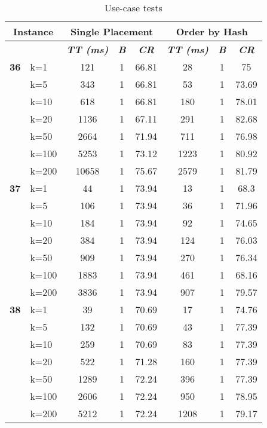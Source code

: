     \begin{table}[htbp]
    \caption{Use-case tests}
    \begin{tabular}{|l|l|c|c|c|c|c|c|}
    
    \multicolumn{ 2}{|c|}{\textbf{Instance}} & \multicolumn{ 3}{c|}{\textbf{Single Placement}} & \multicolumn{ 3}{c|}{\textbf{Order by Hash}} \\ \hline
    \multicolumn{ 2}{|l|}{} & \textbf{\textit{TT (ms)}} & \textbf{\textit{B}} & \textbf{\textit{CR}} & \textbf{\textit{TT (ms)}} & \textbf{\textit{B}} & \textbf{\textit{CR}} \\ \hline
    \multicolumn{1}{|r|}{\textbf{36}} & k=1 & 121 & 1 & 66.81 & 28 & 1 & 75 \\ 
     & k=5 & 343 & 1 & 66.81 & 53 & 1 & 73.69 \\ 
     & k=10 & 618 & 1 & 66.81 & 180 & 1 & 78.01 \\ 
     & k=20 & 1136 & 1 & 67.11 & 291 & 1 & 82.68 \\ 
     & k=50 & 2664 & 1 & 71.94 & 711 & 1 & 76.98 \\ 
     & k=100 & 5253 & 1 & 73.12 & 1223 & 1 & 80.92 \\ 
     & k=200 & 10658 & 1 & 75.67 & 2579 & 1 & 81.79 \\ \hline
    \multicolumn{1}{|r|}{\textbf{37}} & k=1 & 44 & 1 & 73.94 & 13 & 1 & 68.3 \\ 
     & k=5 & 106 & 1 & 73.94 & 36 & 1 & 71.96 \\ 
     & k=10 & 184 & 1 & 73.94 & 92 & 1 & 74.65 \\ 
     & k=20 & 384 & 1 & 73.94 & 124 & 1 & 76.03 \\ 
     & k=50 & 909 & 1 & 73.94 & 270 & 1 & 76.34 \\ 
     & k=100 & 1883 & 1 & 73.94 & 461 & 1 & 68.16 \\ 
     & k=200 & 3836 & 1 & 73.94 & 907 & 1 & 79.57 \\ \hline
    \multicolumn{1}{|r|}{\textbf{38}} & k=1 & 39 & 1 & 70.69 & 17 & 1 & 74.76 \\ 
     & k=5 & 132 & 1 & 70.69 & 43 & 1 & 77.39 \\ 
     & k=10 & 259 & 1 & 70.69 & 83 & 1 & 77.39 \\ 
     & k=20 & 522 & 1 & 71.28 & 160 & 1 & 77.39 \\ 
     & k=50 & 1289 & 1 & 72.24 & 396 & 1 & 77.39 \\ 
     & k=100 & 2606 & 1 & 72.24 & 950 & 1 & 78.95 \\ 
     & k=200 & 5212 & 1 & 72.24 & 1208 & 1 & 79.17 \\ \hline

\end{tabular}
\end{table}
